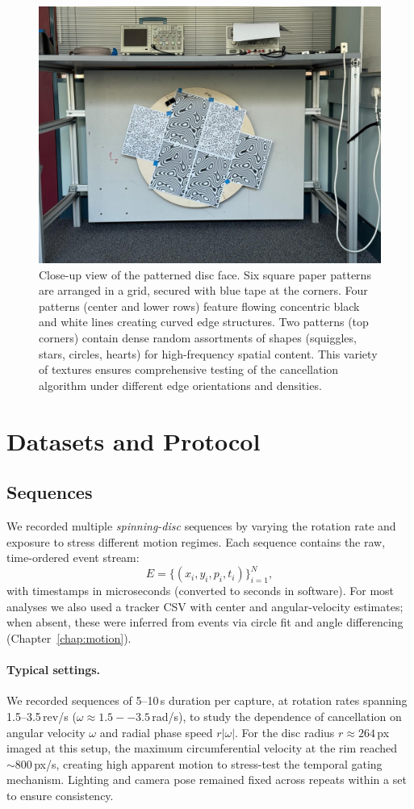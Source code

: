 \begin{figure}[t]
  \centering
  \includegraphics[width=0.7\linewidth]{images/setup_2.jpeg}
  \caption{Close-up view of the patterned disc face. Six square paper patterns are arranged in a grid, secured with blue tape at the corners. Four patterns (center and lower rows) feature flowing concentric black and white lines creating curved edge structures. Two patterns (top corners) contain dense random assortments of shapes (squiggles, stars, circles, hearts) for high-frequency spatial content. This variety of textures ensures comprehensive testing of the cancellation algorithm under different edge orientations and densities.}
  \label{fig:disc}
\end{figure}

\section{Datasets and Protocol}
\label{sec:datasets}

\subsection{Sequences}
We recorded multiple \emph{spinning-disc} sequences by varying the rotation rate and exposure to stress different motion regimes. Each sequence contains the raw, time-ordered event stream:
\[
E = \big\{ (x_i, y_i, p_i, t_i) \big\}_{i=1}^{N},
\]
with timestamps in microseconds (converted to seconds in software). For most analyses we also used a tracker CSV with center and angular-velocity estimates; when absent, these were inferred from events via circle fit and angle differencing (Chapter~\ref{chap:motion}).

\paragraph{Typical settings.}
We recorded sequences of 5--10\,s duration per capture, at rotation rates spanning 1.5--3.5\,rev/s ($\omega \approx 1.5--3.5$\,rad/s), to study the dependence of cancellation on angular velocity $\omega$ and radial phase speed $r|\omega|$. For the disc radius $r \approx 264$\,px imaged at this setup, the maximum circumferential velocity at the rim reached $\sim 800$\,px/s, creating high apparent motion to stress-test the temporal gating mechanism. Lighting and camera pose remained fixed across repeats within a set to ensure consistency.

